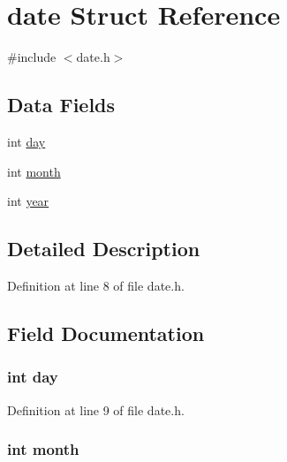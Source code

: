 \hypertarget{structdate}{}\section{date Struct Reference}
\label{structdate}


{\ttfamily \#include $<$date.\+h$>$}

\subsection*{Data Fields}
\begin{DoxyCompactItemize}
\item 
int \hyperlink{structdate_a4c11afc03fc3ee49bab660def6558f2a}{day}
\item 
int \hyperlink{structdate_aedb06abe5aff12fa3e7e0e71a374edfb}{month}
\item 
int \hyperlink{structdate_abeac221e38b7b9ce7df8722c842bf671}{year}
\end{DoxyCompactItemize}


\subsection{Detailed Description}


Definition at line 8 of file date.\+h.



\subsection{Field Documentation}
\hypertarget{structdate_a4c11afc03fc3ee49bab660def6558f2a}{}
\subsubsection[{day}]{\setlength{\rightskip}{0pt plus 5cm}int day}\label{structdate_a4c11afc03fc3ee49bab660def6558f2a}


Definition at line 9 of file date.\+h.

\hypertarget{structdate_aedb06abe5aff12fa3e7e0e71a374edfb}{}
\subsubsection[{month}]{\setlength{\rightskip}{0pt plus 5cm}int month}\label{structdate_aedb06abe5aff12fa3e7e0e71a374edfb}



